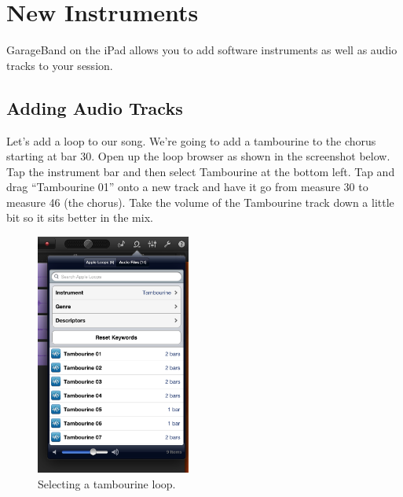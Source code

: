 \documentclass[12pt]{article}
\begin{document}
\section{New Instruments}

GarageBand on the iPad allows you to add software instruments as well as audio tracks to your session.

\subsection{Adding Audio Tracks}
Let's add a loop to our song. We're going to add a tambourine to the chorus starting at bar 30. Open up the loop browser as shown in the screenshot below. Tap the instrument bar and then select Tambourine at the bottom left. Tap and drag ``Tambourine 01'' onto a new track and have it go from measure 30 to measure 46 (the chorus). Take the volume of the Tambourine track down a little bit so it sits better in the mix.
\begin{figure}[h]
   \centering
   \includegraphics[width=2in]{fig/audio.png}  
   \caption*{Selecting a tambourine loop.}
\end{figure}
\end{document}
